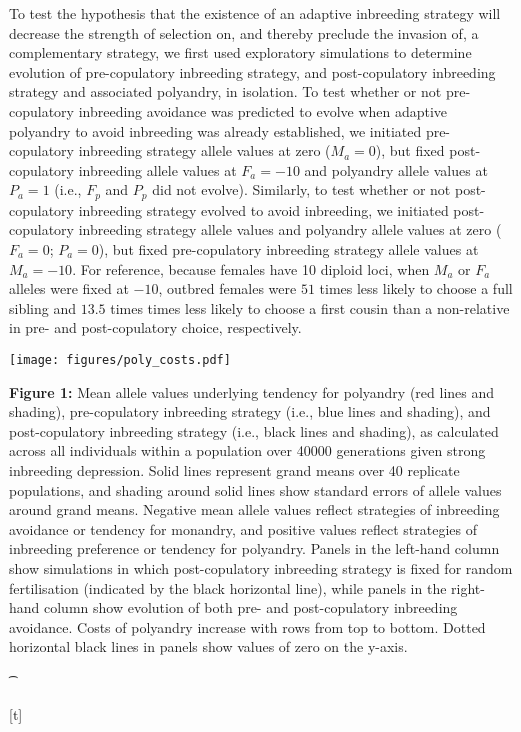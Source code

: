 \documentclass[10pt,letterpaper]{article}
\begin{document}
To test the hypothesis that the existence of an adaptive inbreeding strategy will decrease the strength of selection on, and thereby preclude the invasion of, a complementary strategy, we first used exploratory simulations to determine evolution of pre-copulatory inbreeding strategy, and post-copulatory inbreeding strategy and associated polyandry, in isolation. To test whether or not pre-copulatory inbreeding avoidance was predicted to evolve when adaptive polyandry to avoid inbreeding was already established, we initiated pre-copulatory inbreeding strategy allele values at zero ($M_{a}=0$), but fixed post-copulatory inbreeding allele values at $F_{a}=-10$ and polyandry allele values at $P_{a}=1$ (i.e., $F_{p}$ and $P_{p}$ did not evolve). Similarly, to test whether or not post-copulatory inbreeding strategy evolved to avoid inbreeding, we initiated post-copulatory inbreeding strategy allele values and polyandry allele values at zero ($F_{a}=0$; $P_{a}=0$), but fixed pre-copulatory inbreeding strategy allele values at $M_{a}=-10$. For reference, because females have 10 diploid loci, when $M_{a}$ or $F_{a}$ alleles were fixed at $-10$, outbred females were $51$ times less likely to choose a full sibling and $13.5$ times times less likely to choose a first cousin than a non-relative in pre- and post-copulatory choice, respectively.



 {\color{Gray}
\begin{adjustwidth}{-2.5in}{0in}
{%
   \texttt{[image: figures/poly\_costs.pdf]}%
}%
{%
   \begin{justify}\vspace{10 mm} \textbf{Figure 1:} Mean allele values underlying tendency for polyandry (red lines and shading), pre-copulatory inbreeding strategy (i.e., blue lines and shading), and post-copulatory inbreeding strategy (i.e., black lines and shading), as calculated across all individuals within a population over 40000 generations given strong inbreeding depression. Solid lines represent grand means over 40 replicate populations, and shading around solid lines show standard errors of allele values around grand means. Negative mean allele values reflect strategies of inbreeding avoidance or tendency for monandry, and positive values reflect strategies of inbreeding preference or tendency for polyandry. Panels in the left-hand column show simulations in which post-copulatory inbreeding strategy is fixed for random fertilisation (indicated by the black horizontal line), while panels in the right-hand column show evolution of both pre- and post-copulatory inbreeding avoidance. Costs of polyandry increase with rows from top to bottom. Dotted horizontal black lines in panels show values of zero on the y-axis.\end{justify}{\t}%
}[t]
\end{adjustwidth}
}
\end{document}

